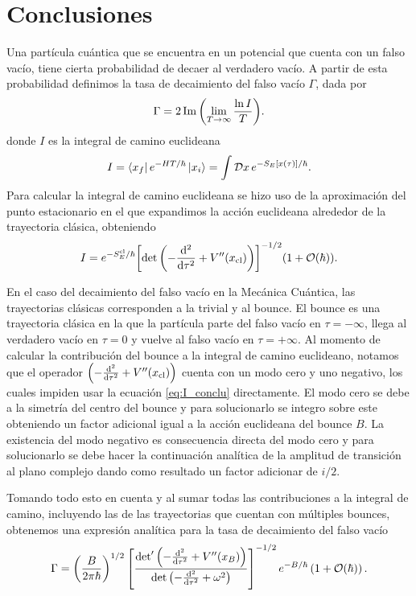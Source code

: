 \chapter{Conclusiones}

Una partícula cuántica que se encuentra en un potencial que cuenta con un falso vacío, tiene cierta probabilidad de decaer al verdadero vacío. A partir de esta probabilidad definimos la tasa de decaimiento del falso vacío $\Gamma$, dada por
\begin{equation} 
\Gamma = 2\Im\qty(\lim_{T \rightarrow \infty} \frac{ \ln I}{T}).
\end{equation}
donde $I$ es la integral de camino euclideana
\begin{equation}
I = \bra{x_f}e^{-HT/\hbar}\ket{x_i} = \int \mathcal{D}x \, e^{-S_E\qty[x\qty(\tau)]/\hbar}.
\end{equation}
Para calcular la integral de camino euclideana se hizo uso de la aproximación del punto estacionario en el que expandimos la acción euclideana alrededor de la trayectoria clásica, obteniendo
\begin{equation} \label{eq:I_conclu}
I = e^{-S_E^{\textrm{cl}} / \hbar} \qty[ \det\left(-\dv[2]{\tau} + V''\qty(x_{\textrm{cl}}) \right) ]^{-1/2} \qty(1 + \order{\hbar}).
\end{equation}

En el caso del decaimiento del falso vacío en la Mecánica Cuántica, las trayectorias clásicas corresponden a la trivial y al bounce. El bounce es una trayectoria clásica en la que la partícula parte del falso vacío en $\tau = -\infty$, llega al verdadero vacío en $\tau = 0$ y vuelve al falso vacío en $\tau = +\infty$. Al momento de calcular la contribución del bounce a la integral de camino euclideano, notamos que el operador $\qty(-\dv[2]{\tau} + V''\qty(x_{\textrm{cl}}))$ cuenta con un modo cero y uno negativo, los cuales impiden usar la ecuación \eqref{eq:I_conclu} directamente. El modo cero se debe a la simetría del centro del bounce y para solucionarlo se integro sobre este obteniendo un factor adicional igual a la acción euclideana del bounce $B$. La existencia del modo negativo es consecuencia directa del modo cero y para solucionarlo se debe hacer la continuación analítica de la amplitud de transición al plano complejo dando como resultado un factor adicionar de $i/2$. 

Tomando todo esto en cuenta y al sumar todas las contribuciones a la integral de camino, incluyendo las de las trayectorias que cuentan con múltiples bounces, obtenemos una expresión analítica para la tasa de decaimiento del falso vacío
\begin{equation} 
\Gamma = \left(\frac{B}{2\pi\hbar}\right)^{1/2}  \left[ \frac{\textrm{det}' \left(-\dv[2]{}{\tau} + V''(x_B) \right)}{\det \left(-\dv[2]{}{\tau} + \omega^2 \right)} \right]^{-1/2}e^{-B/\hbar}\left( 1 + \mathcal{O}(\hbar)\right).
\end{equation}

